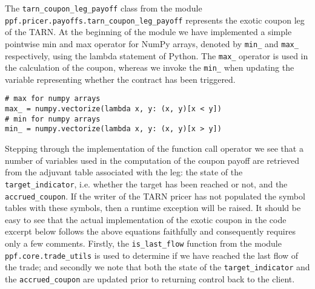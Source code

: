The \verb|tarn_coupon_leg_payoff| class from the module \\
\verb|ppf.pricer.payoffs.tarn_coupon_leg_payoff| represents the exotic coupon leg of the TARN. At the beginning of the module 
we have implemented a simple pointwise min and max operator for NumPy arrays, denoted by \verb|min_| and \verb|max_| respectively, using the lambda statement of Python. The \verb|max_| 
operator is used in the calculation of the coupon, whereas we invoke the \verb|min_| when updating the variable representing whether the contract has been triggered. 
\begin{verbatim}
# max for numpy arrays
max_ = numpy.vectorize(lambda x, y: (x, y)[x < y])
# min for numpy arrays
min_ = numpy.vectorize(lambda x, y: (x, y)[x > y])
\end{verbatim}
Stepping through the implementation of the function call operator we see that a number of variables used in the computation of the coupon payoff are retrieved from the adjuvant table associated with the leg: the state of the \verb|target_indicator|, i.e. whether the target has been reached or not, and the \verb|accrued_coupon|. If the writer of the TARN pricer has not populated the symbol tables with these symbols, then a runtime exception will be raised. It should be easy to see that the actual implementation of the exotic coupon in the code excerpt below follows the above equations faithfully and consequently requires only a few comments. Firstly, the \verb|is_last_flow| function from the module \verb|ppf.core.trade_utils| is used to determine if we have reached the last flow of the trade; and secondly we note that both the state of the \verb|target_indicator| and the \verb|accrued_coupon| are updated prior to returning control back to the client.

